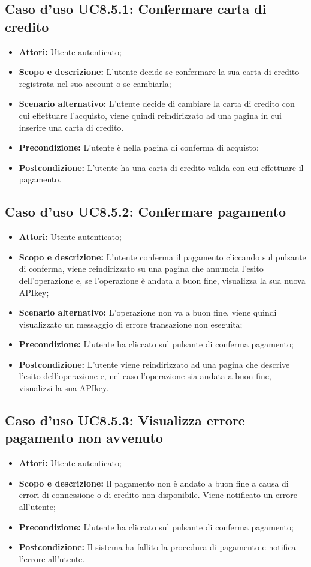 \documentclass[12pt,a4paper,titlepage]{article}
\begin{document}
	\subsection{Caso d'uso UC8.5.1: Confermare carta di credito}
	\label{UC8.5.1}
	\begin{itemize}
		\item \textbf{Attori: }Utente autenticato;
		\item \textbf{Scopo e descrizione: }L'utente decide se confermare la sua carta di credito registrata nel suo account o se cambiarla;
		\item \textbf{Scenario alternativo: }L'utente decide di cambiare la carta di credito con cui effettuare l'acquisto, viene quindi reindirizzato ad una pagina in cui inserire una carta di credito.
		\item \textbf{Precondizione: }L'utente è nella pagina di conferma di acquisto;
		\item \textbf{Postcondizione: }L'utente ha una carta di credito valida con cui effettuare il pagamento.
	\end{itemize}
	\subsection{Caso d'uso UC8.5.2: Confermare pagamento}
	\label{UC8.5.2}
	\begin{itemize}
		\item \textbf{Attori: }Utente autenticato;
		\item \textbf{Scopo e descrizione: }L'utente conferma il pagamento cliccando sul pulsante di conferma, viene reindirizzato su una pagina che annuncia l'esito dell'operazione e, se l'operazione è andata a buon fine, visualizza la sua nuova APIkey;
		\item \textbf{Scenario alternativo: }L'operazione non va a buon fine, viene quindi visualizzato un messaggio di errore transazione non eseguita;
		\item \textbf{Precondizione: }L'utente ha cliccato sul pulsante di conferma pagamento;
		\item \textbf{Postcondizione: }L'utente viene reindirizzato ad una pagina che descrive l'esito dell'operazione e, nel caso l'operazione sia andata a buon fine, visualizzi la sua APIkey.
	\end{itemize}
	\subsection{Caso d'uso UC8.5.3: Visualizza errore pagamento non avvenuto}
	\label{UC8.5.3}
	\begin{itemize}
		\item \textbf{Attori: }Utente autenticato;
		\item \textbf{Scopo e descrizione: }Il pagamento non è andato a buon fine a causa di errori di connessione o di credito non disponibile. Viene notificato un errore all'utente;
		\item \textbf{Precondizione: }L'utente ha cliccato sul pulsante di conferma pagamento;
		\item \textbf{Postcondizione: }Il sistema ha fallito la procedura di pagamento e notifica l'errore all'utente.
	\end{itemize}
\end{document}
